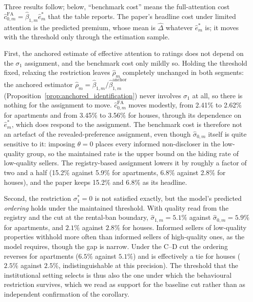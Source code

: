Three results follow; below, ``benchmark cost'' means the full-attention cost $\hat c_{0,m}^{\mathrm{FA}}=\hat\beta_{1,m}\hat e^*_m$ that the table reports. The paper's headline cost under limited attention is the predicted premium, whose mean is $\hat\Delta$ whatever $\hat e^*_m$ is; it moves with the threshold only through the estimation sample.

First, the anchored estimate of effective attention to ratings does not depend on the $\sigma_1$ assignment, and the
benchmark cost only mildly so. Holding the threshold fixed, relaxing the restriction leaves
$\hat\rho_m$ completely unchanged in both segments: the anchored estimator
$\hat\rho_m=\hat\beta_{1,m}/\hat\beta_{1,m}^{\mathrm{anchor}}$ (Proposition~\ref{prop:anchored_identification})
never involves $\sigma_1$ at all, so there is nothing for the assignment to move. $\hat
c^{\mathrm{FA}}_{0,m}$ moves modestly, from 2.41\% to 2.62\% for apartments and from 3.45\% to 3.56\% for
houses, through its dependence on $\hat e^*_m$, which does respond to the assignment. The
benchmark cost is therefore not an artefact of the revealed-preference assignment, even
though $\hat\sigma_{0,m}$ itself is quite sensitive to it: imposing $\theta=0$ places every
informed non-discloser in the low-quality group, so the maintained rate is the upper bound on
the hiding rate of low-quality sellers. The registry-based assignment lowers it by roughly a
factor of two and a half (15.2\% against 5.9\% for apartments, 6.8\% against 2.8\% for houses),
and the paper keeps 15.2\% and 6.8\% as its headline.

Second, the restriction $\sigma_1^*=0$ is not satisfied exactly, but the model's predicted
\emph{ordering} holds under the maintained threshold. With quality read from the registry and
the cut at the rental-ban boundary, $\hat\sigma_{1,m} = 5.1\%$ against
$\hat\sigma_{0,m} = 5.9\%$ for apartments, and $2.1\%$ against $2.8\%$ for houses. Informed
sellers of low-quality properties withhold more often than informed sellers of high-quality
ones, as the model requires, though the gap is narrow. Under the C--D cut the ordering
reverses for apartments ($6.5\%$ against $5.1\%$) and is effectively a tie for houses ($2.5\%$
against $2.5\%$, indistinguishable at this precision). The threshold that the institutional
setting selects is thus also the one under which the behavioural restriction survives, which
we read as support for the baseline cut rather than as independent confirmation of the
corollary.

